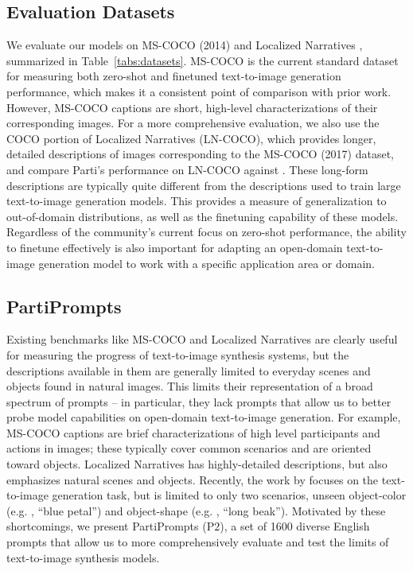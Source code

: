 \subsection{Evaluation Datasets}

We evaluate our models on MS-COCO (2014) \cite{lin2014microsoft} and Localized Narratives \cite{PontTuset_eccv2020}, summarized in Table~\ref{tabs:datasets}. MS-COCO is the current standard dataset for measuring both zero-shot and finetuned text-to-image generation performance, which makes it a consistent point of comparison with prior work. However, MS-COCO captions are short, high-level characterizations of their corresponding images. For a more comprehensive evaluation, we also use the COCO portion of Localized Narratives (LN-COCO), which provides longer, detailed descriptions of images corresponding to the MS-COCO (2017) dataset, and compare Parti's performance on LN-COCO against \cite{trecs2020, zhang2021cross}. These long-form descriptions are typically quite different from the descriptions used to train large text-to-image generation models. This provides a measure of generalization to out-of-domain distributions, as well as the finetuning capability of these models. Regardless of the community's current focus on zero-shot performance, the ability to finetune effectively is also important for adapting an open-domain text-to-image generation model to work with a specific application area or domain.

\subsection{PartiPrompts}
\label{secs:bcp}

Existing benchmarks like MS-COCO \cite{lin2014microsoft} and Localized Narratives \cite{PontTuset_eccv2020} are clearly useful for measuring the progress of text-to-image synthesis systems, but the descriptions available in them are generally limited to everyday scenes and objects found in natural images. This limits their representation of a broad spectrum of prompts -- in particular, they lack prompts that allow us to better probe model capabilities on open-domain text-to-image generation. For example, MS-COCO captions are brief characterizations of high level participants and actions in images; these typically cover common scenarios and are oriented toward objects. Localized Narratives has highly-detailed descriptions, but also emphasizes natural scenes and objects. Recently, the work by \cite{park2021benchmark} focuses on the text-to-image generation task, but is limited to only two scenarios, unseen object-color (e.g. , ``blue petal'') and object-shape (e.g. , ``long beak''). Motivated by these shortcomings, we present PartiPrompts (P$2$), a set of 1600 diverse English prompts that allow us to more comprehensively evaluate and test the limits of text-to-image synthesis models.

